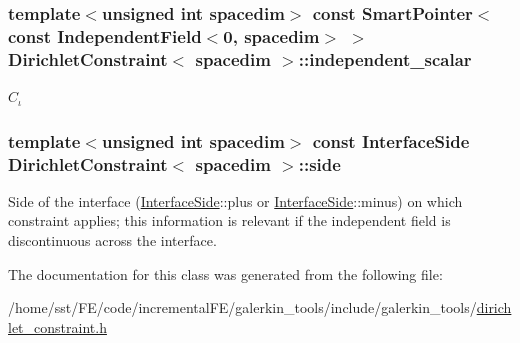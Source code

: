 \subsubsection[{\texorpdfstring{independent\+\_\+scalar}{independent_scalar}}]{\setlength{\rightskip}{0pt plus 5cm}template$<$unsigned int spacedim$>$ const {\bf Smart\+Pointer}$<$const {\bf Independent\+Field}$<$0, spacedim$>$ $>$ {\bf Dirichlet\+Constraint}$<$ spacedim $>$\+::independent\+\_\+scalar}\hypertarget{class_dirichlet_constraint_a8793f0d41a9c6e88638d7cf5d52a6fdd}{}\label{class_dirichlet_constraint_a8793f0d41a9c6e88638d7cf5d52a6fdd}
$C_\iota$ 
\subsubsection[{\texorpdfstring{side}{side}}]{\setlength{\rightskip}{0pt plus 5cm}template$<$unsigned int spacedim$>$ const {\bf Interface\+Side} {\bf Dirichlet\+Constraint}$<$ spacedim $>$\+::side}\hypertarget{class_dirichlet_constraint_ae049d107664d3bf23d287ec77545b6f3}{}\label{class_dirichlet_constraint_ae049d107664d3bf23d287ec77545b6f3}
Side of the interface (\hyperlink{triangulation__system_8h_a44f3c00e36c1d6e3c389ae693c09b435}{Interface\+Side}\+:\+:{\ttfamily plus} or \hyperlink{triangulation__system_8h_a44f3c00e36c1d6e3c389ae693c09b435}{Interface\+Side}\+:\+:{\ttfamily minus}) on which constraint applies; this information is relevant if the independent field is discontinuous across the interface. 

The documentation for this class was generated from the following file\+:\begin{DoxyCompactItemize}
\item 
/home/sst/\+F\+E/code/incremental\+F\+E/galerkin\+\_\+tools/include/galerkin\+\_\+tools/\hyperlink{dirichlet__constraint_8h}{dirichlet\+\_\+constraint.\+h}\end{DoxyCompactItemize}
